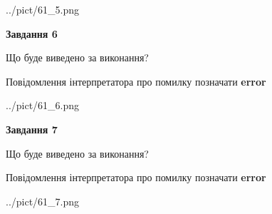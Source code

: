 \documentclass[10pt, ukrainian]{article}
\begin{document}
{\begin {large}
\begin{center}
	{../pict/61_5.png}
\end{center}
\newpage

{\begin {center}\textbf{Завдання 6}\end {center}}\par
Що буде виведено за виконання? \par
Повідомлення інтерпретатора про помилку позначати \textbf{error}

\begin{center}
	{../pict/61_6.png}
\end{center}
\newpage

{\begin {center}\textbf{Завдання 7}\end {center}}\par
Що буде виведено за виконання? \par
Повідомлення інтерпретатора про помилку позначати \textbf{error}

\begin{center}
	{../pict/61_7.png}
\end{center}
\newpage

\end {large}}
\end{document}
